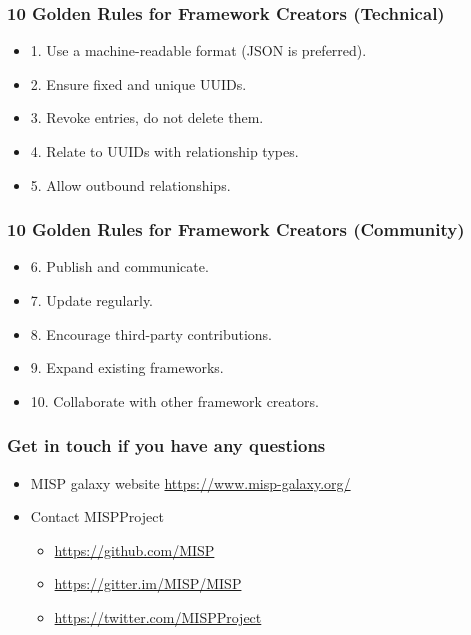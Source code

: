 \begin{frame}
        \frametitle{10 Golden Rules for Framework Creators (Technical)}
        \begin{itemize}
            \item 1. Use a machine-readable format (JSON is preferred).
            \item 2. Ensure fixed and unique UUIDs.
            \item 3. Revoke entries, do not delete them.
            \item 4. Relate to UUIDs with relationship types.
            \item 5. Allow outbound relationships.
        \end{itemize}
\end{frame}

\begin{frame}
        \frametitle{10 Golden Rules for Framework Creators (Community)}
        \begin{itemize}
            \item 6. Publish and communicate.
            \item 7. Update regularly.
            \item 8. Encourage third-party contributions.
            \item 9. Expand existing frameworks.
            \item 10. Collaborate with other framework creators.
        \end{itemize}
\end{frame}


\begin{frame}
  \frametitle{Get in touch if you have any questions}
  \begin{itemize}
    \item MISP galaxy website \url{https://www.misp-galaxy.org/}
    \item Contact MISPProject
    \begin{itemize}
      \item \url{https://github.com/MISP}
      \item \url{https://gitter.im/MISP/MISP}
      \item \url{https://twitter.com/MISPProject}
    \end{itemize}
  \end{itemize}
\end{frame}
